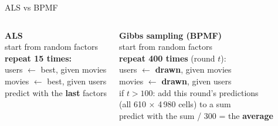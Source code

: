 \documentclass[aspectratio=169,11pt]{beamer}
\newcommand{\key}[1]{\textcolor{accent}{\textbf{#1}}}
\begin{document}
\begin{frame}{ALS vs BPMF}
\begin{columns}[T]
\colorbox{soft!12}{\parbox{0.95\linewidth}{
\textbf{ALS}\\[0.3em]
\small
start from random factors\\
\textbf{repeat 15 times:}\\
\hspace*{1em}users $\leftarrow$ best, given movies\\
\hspace*{1em}movies $\leftarrow$ best, given users\\[0.3em]
predict with the \key{last} factors
}}
\colorbox{accent!8}{\parbox{0.95\linewidth}{
\textbf{Gibbs sampling (BPMF)}\\[0.3em]
\small
start from random factors\\
\textbf{repeat 400 times} (round $t$):\\
\hspace*{1em}users $\leftarrow$ \key{drawn}, given movies\\
\hspace*{1em}movies $\leftarrow$ \key{drawn}, given users\\
\hspace*{1em}if $t > 100$: add this round's predictions\\
\hspace*{1em}\phantom{if $t > 100$:} (all 610 $\times$ 4\,980 cells) to a sum\\[0.3em]
predict with the sum / 300 = the \key{average}
}}
\end{columns}

\vspace{0.6em}
\begin{center}
\end{center}
\end{frame}
\end{document}
